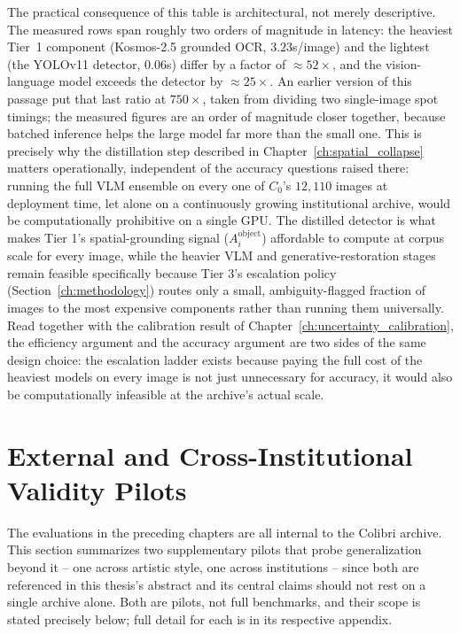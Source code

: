 \documentclass[12pt,a4paper]{report}
\begin{document}
The practical consequence of this table is architectural, not merely descriptive. The measured rows span roughly two orders of magnitude in latency: the heaviest Tier~1 component (Kosmos-2.5 grounded OCR, $3.23$s/image) and the lightest (the YOLOv11 detector, $0.06$s) differ by a factor of $\approx 52\times$, and the vision-language model exceeds the detector by $\approx 25\times$. An earlier version of this passage put that last ratio at $750\times$, taken from dividing two single-image spot timings; the measured figures are an order of magnitude closer together, because batched inference helps the large model far more than the small one. This is precisely why the distillation step described in Chapter~\ref{ch:spatial_collapse} matters operationally, independent of the accuracy questions raised there: running the full VLM ensemble on every one of $C_0$'s $12{,}110$ images at deployment time, let alone on a continuously growing institutional archive, would be computationally prohibitive on a single GPU. The distilled detector is what makes Tier 1's spatial-grounding signal ($A_i^{\text{object}}$) affordable to compute at corpus scale for every image, while the heavier VLM and generative-restoration stages remain feasible specifically because Tier 3's escalation policy (Section~\ref{ch:methodology}) routes only a small, ambiguity-flagged fraction of images to the most expensive components rather than running them universally. Read together with the calibration result of Chapter~\ref{ch:uncertainty_calibration}, the efficiency argument and the accuracy argument are two sides of the same design choice: the escalation ladder exists because paying the full cost of the heaviest models on every image is not just unnecessary for accuracy, it would also be computationally infeasible at the archive's actual scale.

\section{External and Cross-Institutional Validity Pilots}
The evaluations in the preceding chapters are all internal to the Colibri archive. This section summarizes two supplementary pilots that probe generalization beyond it -- one across artistic style, one across institutions -- since both are referenced in this thesis's abstract and its central claims should not rest on a single archive alone. Both are pilots, not full benchmarks, and their scope is stated precisely below; full detail for each is in its respective appendix.
\end{document}
